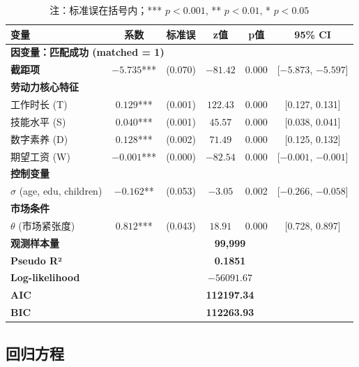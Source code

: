 \documentclass[12pt, a4paper]{article}
\begin{document}
\begin{table}[htbp]
\centering
\small
\begin{tabular}{lccccc}
\toprule
\textbf{变量} & \textbf{系数} & \textbf{标准误} & \textbf{z值} & \textbf{p值} & \textbf{95\% CI} \\
\midrule
\multicolumn{6}{l}{\textbf{因变量：匹配成功 (matched = 1)}} \\
\midrule
\textbf{截距项} & $-5.735$*** & (0.070) & $-81.42$ & 0.000 & [$-5.873$, $-5.597$] \\
\midrule
\multicolumn{6}{l}{\textbf{劳动力核心特征}} \\
\quad 工作时长 (T) & $0.129$*** & (0.001) & $122.43$ & 0.000 & [0.127, 0.131] \\
\quad 技能水平 (S) & $0.040$*** & (0.001) & $45.57$ & 0.000 & [0.038, 0.041] \\
\quad 数字素养 (D) & $0.128$*** & (0.002) & $71.49$ & 0.000 & [0.125, 0.132] \\
\quad 期望工资 (W) & $-0.001$*** & (0.000) & $-82.54$ & 0.000 & [$-0.001$, $-0.001$] \\
\midrule
\multicolumn{6}{l}{\textbf{控制变量}} \\
\quad $\sigma$ (age, edu, children) & $-0.162$** & (0.053) & $-3.05$ & 0.002 & [$-0.266$, $-0.058$] \\
\midrule
\multicolumn{6}{l}{\textbf{市场条件}} \\
\quad $\theta$ (市场紧张度) & $0.812$*** & (0.043) & $18.91$ & 0.000 & [0.728, 0.897] \\
\midrule
\midrule
\textbf{观测样本量} & \multicolumn{5}{c}{\textbf{99,999}} \\
\textbf{Pseudo R²} & \multicolumn{5}{c}{\textbf{0.1851}} \\
\textbf{Log-likelihood} & \multicolumn{5}{c}{\textbf{$-56091.67$}} \\
\textbf{AIC} & \multicolumn{5}{c}{\textbf{112197.34}} \\
\textbf{BIC} & \multicolumn{5}{c}{\textbf{112263.93}} \\
\bottomrule
\end{tabular}
\caption*{注：标准误在括号内；*** $p<0.001$, ** $p<0.01$, * $p<0.05$}
\end{table}

\vspace{1cm}

\subsection*{回归方程}
\end{document}
